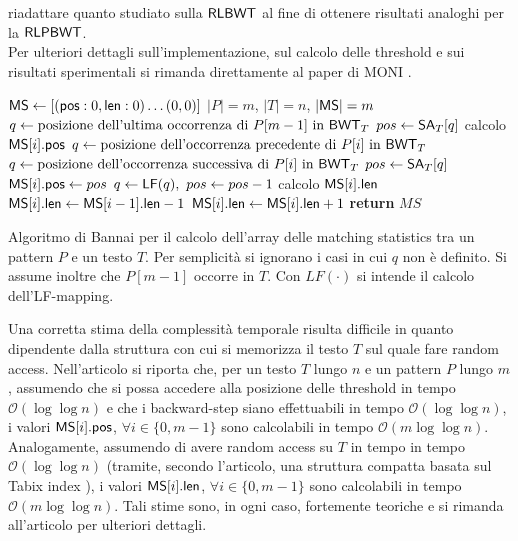 riadattare quanto studiato sulla $\mbox{\rm {\sf RLBWT}}$ al fine di ottenere
risultati analoghi per la $\mbox{\rm {\sf RLPBWT}}$.\\
Per ulteriori dettagli sull'implementazione, sul calcolo delle
threshold e sui risultati sperimentali si rimanda direttamente al paper
di MONI \cite{moni}.
\begin{algorithm}
  \footnotesize
  \begin{algorithmic}[1]
    \State $\mbox{\rm {\sf MS}}\gets[(\mbox{\rm {\sf pos}} : 0, \mbox{\rm {\sf len}} : 0) \ldots (0, 0)]$
    \Comment $|P| = m$, $|T| = n$, $|\mbox{\rm {\sf MS}}| = m$
    \State $q\gets\mbox{posizione dell'ultima occorrenza di }P[m-1] \mbox{ in }
    \mbox{\rm {\sf BWT}}_T$ 
    \State $pos \gets \mbox{\rm {\sf SA}}_T[q]$
    \Comment calcolo $\mbox{\rm {\sf MS}}[i].\mbox{\rm {\sf pos}}$
    \State $q\gets\mbox{posizione dell'occorrenza precedente di }P[i] \mbox{ in
    } \mbox{\rm {\sf BWT}}_T$
    \Else
    \State $q\gets\mbox{posizione dell'occorrenza successiva di }P[i] \mbox{ in
    } \mbox{\rm {\sf BWT}}_T$
    \EndIf
    \State $pos\gets \mbox{\rm {\sf SA}}_T[q]$
    \EndIf
    \State $\mbox{\rm {\sf MS}}[i].\mbox{\rm {\sf pos}} \gets pos$
    \State $q\gets \mbox{\rm {\sf LF}}(q),\,\,pos\gets pos-1$
    \EndFor
    \Comment calcolo $\mbox{\rm {\sf MS}}[i].\mbox{\rm {\sf len}}$
    \State $\mbox{\rm {\sf MS}}[i].\mbox{\rm {\sf len}}\gets \mbox{\rm {\sf MS}}[i-1].\mbox{\rm {\sf len}}-1$
    \State  $\mbox{\rm {\sf MS}}[i].\mbox{\rm {\sf len}}\gets \mbox{\rm {\sf MS}}[i].\mbox{\rm {\sf len}}+1$
    \EndWhile
    \EndFor
    \State \textbf{return} $MS$
    \EndFunction
  \end{algorithmic}
  \caption{Algoritmo di Bannai per il calcolo dell'array delle matching
  statistics tra un 
  pattern $P$ e un testo $T$. Per
  semplicità si ignorano i casi in cui $q$ non è definito. Si
  assume inoltre che $P[m-1]$ occorre in $T$. Con $LF(\cdot)$ si intende il
  calcolo dell'LF-mapping.}
  \label{algo:bannai}
\end{algorithm}
Una corretta stima della complessità temporale risulta difficile in quanto 
dipendente dalla struttura con cui si memorizza il testo $T$ sul quale fare 
random access. Nell'articolo si riporta che, per un testo $T$ lungo
 $n$ e un pattern $P$ lungo $m$, assumendo che si possa accedere
alla posizione delle threshold in tempo $\mathcal{O}(\log\log n)$ e che 
i backward-step siano effettuabili in tempo $\mathcal{O}(\log\log n)$, i valori
$\mbox{\rm {\sf MS}}[i].\mbox{\rm {\sf pos}}$, $\forall i\in\{0,m-1\}$ sono calcolabili in tempo 
$\mathcal{O}(m\log\log n)$.
Analogamente, assumendo di avere random access su $T$ in tempo in tempo 
$\mathcal{O}(\log\log n)$ (tramite, secondo l'articolo, una struttura compatta basata sul Tabix index \cite{tabix}), i valori
$\mbox{\rm {\sf MS}}[i].\mbox{\rm {\sf len}}$, $\forall i\in\{0,m-1\}$ sono calcolabili in tempo 
$\mathcal{O}(m\log\log n)$. Tali stime sono, in ogni caso, fortemente teoriche e si rimanda all'articolo per ulteriori dettagli.
